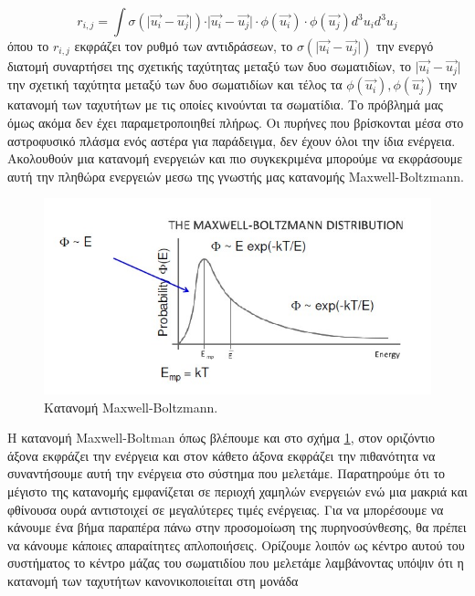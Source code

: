 \begin{equation}
\label{eq53}
r_{i,j}= \int \sigma( \vert \vec{u_{i}}- \vec{u_{j}} \vert) \cdot \vert \vec{u_{i}}- \vec{u_{j}} \vert \cdot \phi(\vec{u_{i}}) \cdot \phi(\vec{u_{j}})d^{3}u_{i}d^{3}u_{j}
\end{equation}
όπου το $r_{i,j}$ εκφράζει τον ρυθμό των αντιδράσεων, το $\sigma( \vert \vec{u_{i}}- \vec{u_{j}} \vert)$ την ενεργό διατομή συναρτήσει της σχετικής ταχύτητας μεταξύ των δυο σωματιδίων, το $\vert \vec{u_{i}}- \vec{u_{j}} \vert $ την σχετική ταχύτητα μεταξύ των δυο σωματιδίων και τέλος τα $\phi(\vec{u_{i}}), \phi(\vec{u_{j}})$ την κατανομή των ταχυτήτων με τις οποίες κινούνται τα σωματίδια.
Το πρόβλημά μας όμως ακόμα δεν έχει παραμετροποιηθεί πλήρως. Οι πυρήνες που βρίσκονται μέσα στο αστροφυσικό πλάσμα ενός αστέρα για παράδειγμα, δεν έχουν όλοι την ίδια ενέργεια. Ακολουθούν μια κατανομή ενεργειών και πιο συγκεκριμένα μπορούμε να εκφράσουμε αυτή την πληθώρα ενεργειών μεσω της γνωστής μας κατανομής Maxwell-Boltzmann.

\begin{figure}[t]
    \centering
    \includegraphics[scale=0.7]{Figures/mb.jpg} 
    \caption{Κατανομή Maxwell-Boltzmann.}
    \label{fig:apx:mb}
\end{figure} 
Η κατανομή Maxwell-Boltman όπως βλέπουμε και στο σχήμα \ref{fig:apx:mb}, στον οριζόντιο άξονα εκφράζει την ενέργεια και στον κάθετο άξονα εκφράζει την πιθανότητα να συναντήσουμε αυτή την ενέργεια στο σύστημα που μελετάμε. Παρατηρούμε ότι το μέγιστο της κατανομής εμφανίζεται σε περιοχή χαμηλών ενεργειών ενώ μια μακριά και φθίνουσα ουρά αντιστοιχεί σε μεγαλύτερες τιμές ενέργειας. Για να μπορέσουμε να κάνουμε ένα βήμα παραπέρα πάνω στην προσομοίωση της πυρηνοσύνθεσης, θα πρέπει να κάνουμε κάποιες απαραίτητες απλοποιήσεις. Ορίζουμε λοιπόν ως κέντρο αυτού του συστήματος το κέντρο μάζας του σωματιδίου που μελετάμε λαμβάνοντας υπόψιν ότι η κατανομή των ταχυτήτων κανονικοποιείται στη μονάδα


